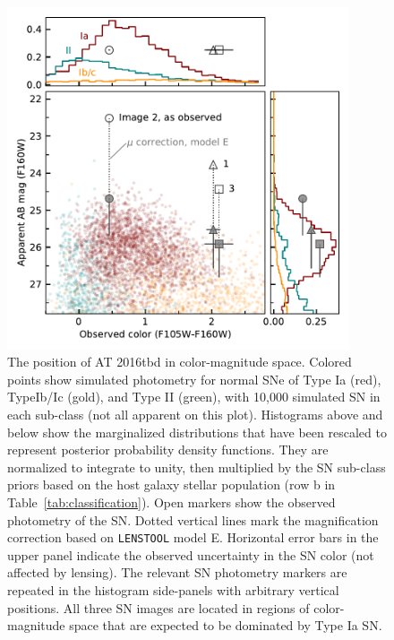 \documentclass[12pt]{article}
\def\SNABC{AT 2016tbd\xspace}
\def\lenstool{{\tt LENSTOOL}\xspace}
\begin{document}
\begin{figure}
    \centering
    \includegraphics[width=0.9\textwidth]{Paper/Figures/colormag_classification_supplement.pdf}
    \caption{The position of \SNABC in color-magnitude space.
    Colored points show simulated photometry for normal SNe of Type Ia (red), TypeIb/Ic (gold), and Type II (green), with 10,000 simulated SN in each sub-class (not all apparent on this plot).  Histograms above and below show the marginalized distributions that have been rescaled to represent posterior probability density functions. They are normalized to integrate to unity, then multiplied by the SN sub-class priors based on the host galaxy stellar population (row b in Table~\ref{tab:classification}).  Open markers show the observed photometry of the SN. Dotted vertical lines mark the magnification correction based on \lenstool model E.    Horizontal error bars in the upper panel indicate the observed uncertainty in 
    the SN color (not affected by lensing).  The relevant SN photometry markers are repeated in the histogram side-panels with arbitrary vertical positions.  All three SN images are located in regions of color-magnitude space that are expected to be dominated by Type Ia SN.}
    \label{fig:colormag_classification_supplement}
\end{figure}
\end{document}
